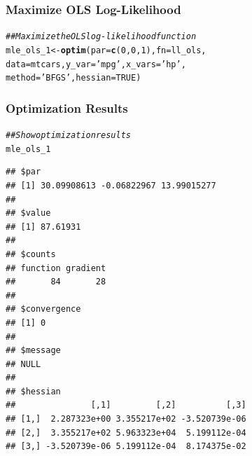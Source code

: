 \documentclass{beamer}\usepackage[]{graphicx}\usepackage[]{xcolor}
\makeatletter
\newcommand{\hlnum}[1]{\textcolor[rgb]{0.686,0.059,0.569}{#1}}%
\newcommand{\hlstr}[1]{\textcolor[rgb]{0.192,0.494,0.8}{#1}}%
\newcommand{\hlcom}[1]{\textcolor[rgb]{0.678,0.584,0.686}{\textit{#1}}}%
\newcommand{\hlstd}[1]{\textcolor[rgb]{0.345,0.345,0.345}{#1}}%
\newcommand{\hlkwb}[1]{\textcolor[rgb]{0.69,0.353,0.396}{#1}}%
\newcommand{\hlkwc}[1]{\textcolor[rgb]{0.333,0.667,0.333}{#1}}%
\newcommand{\hlkwd}[1]{\textcolor[rgb]{0.737,0.353,0.396}{\textbf{#1}}}%
\newenvironment{kframe}{%
 \def\at@end@of@kframe{}%
 \ifinner\ifhmode%
  \def\at@end@of@kframe{\end{minipage}}%
  \begin{minipage}{\columnwidth}%
 \fi\fi%
 \def\FrameCommand##1{\hskip\@totalleftmargin \hskip-\fboxsep
 \colorbox{shadecolor}{##1}\hskip-\fboxsep
     \hskip-\linewidth \hskip-\@totalleftmargin \hskip\columnwidth}%
 \MakeFramed {\advance\hsize-\width
   \@totalleftmargin\z@ \linewidth\hsize
   \@setminipage}}%
 {\par\unskip\endMakeFramed%
 \at@end@of@kframe}
\newenvironment{knitrout}{}{} %
\makeatother
\begin{document}
\begin{frame}[fragile]\frametitle{Maximize OLS Log-Likelihood}
\begin{knitrout}\footnotesize
{}\color{fgcolor}\begin{kframe}
\begin{alltt}
\hlcom{## Maximize the OLS log-likelihood function}
\hlstd{mle_ols_1} \hlkwb{<-} \hlkwd{optim}\hlstd{(}\hlkwc{par} \hlstd{=} \hlkwd{c}\hlstd{(}\hlnum{0}\hlstd{,} \hlnum{0}\hlstd{,} \hlnum{1}\hlstd{),} \hlkwc{fn} \hlstd{= ll_ols,}
                   \hlkwc{data} \hlstd{= mtcars,} \hlkwc{y_var} \hlstd{=} \hlstr{'mpg'}\hlstd{,} \hlkwc{x_vars} \hlstd{=} \hlstr{'hp'}\hlstd{,}
                   \hlkwc{method} \hlstd{=} \hlstr{'BFGS'}\hlstd{,} \hlkwc{hessian} \hlstd{=} \hlnum{TRUE}\hlstd{)}
\end{alltt}
\end{kframe}
\end{knitrout}
\end{frame}

\begin{frame}[fragile]\frametitle{Optimization Results}
\begin{knitrout}\scriptsize
{}\color{fgcolor}\begin{kframe}
\begin{alltt}
\hlcom{## Show optimization results}
\hlstd{mle_ols_1}
\end{alltt}
\begin{verbatim}
## $par
## [1] 30.09908613 -0.06822967 13.99015277
## 
## $value
## [1] 87.61931
## 
## $counts
## function gradient 
##       84       28 
## 
## $convergence
## [1] 0
## 
## $message
## NULL
## 
## $hessian
##               [,1]         [,2]          [,3]
## [1,]  2.287323e+00 3.355217e+02 -3.520739e-06
## [2,]  3.355217e+02 5.963323e+04  5.199112e-04
## [3,] -3.520739e-06 5.199112e-04  8.174375e-02
\end{verbatim}
\end{kframe}
\end{knitrout}
\end{frame}
\end{document}
